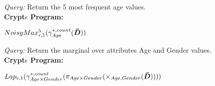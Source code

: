 \begin{exmp}\textit{Query: } Return the 5 most frequent age values.\\\textbf{Crypt$\epsilon$ Program:}\end{exmp}
$NoisyMax^5_{\epsilon,1}(\gamma^{*,count}_{Age}(\boldsymbol{\tilde{D}}))$%
\begin{exmp}\textit{Query: } Return the marginal over attributes Age and Gender values.\\\textbf{Crypt$\epsilon$ Program:}\end{exmp}
$Lap_{\epsilon,1}(\gamma^{*,count}_{Age\times Gender}(\pi_{Age \times Gender}(\times_{Age,Gender}(\boldsymbol{\tilde{D}}))))$%

